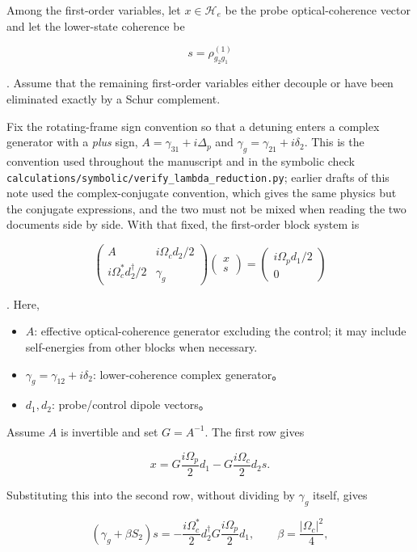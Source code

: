 \documentclass[
  10pt,
  a4paper,
]{article}
\providecommand{\tightlist}{%
  \setlength{\itemsep}{0pt}\setlength{\parskip}{0pt}}
\begin{document}
Among the first-order variables, let \(x\in\mathcal H_e\) be the probe
optical-coherence vector and let the lower-state coherence be

\[
s=\rho_{g_2g_1}^{(1)}
\]

. Assume that the remaining first-order variables either decouple or
have been eliminated exactly by a Schur complement.

Fix the rotating-frame sign convention so that a detuning enters a complex
generator with a \emph{plus} sign, $A=\gamma_{31}+i\Delta_p$ and
$\gamma_g=\gamma_{21}+i\delta_2$. This is the convention used throughout the
manuscript and in the symbolic check
\texttt{calculations/symbolic/verify\_lambda\_reduction.py}; earlier drafts of
this note used the complex-conjugate convention, which gives the same physics
but the conjugate expressions, and the two must not be mixed when reading the
two documents side by side. With that fixed, the first-order block system is

\[
\begin{pmatrix}
A & i\Omega_c d_2/2\\
i\Omega_c^*d_2^\dagger/2 & \gamma_g
\end{pmatrix}
\begin{pmatrix}x\\s\end{pmatrix}
=
\begin{pmatrix}i\Omega_p d_1/2\\0\end{pmatrix}
\]

. Here,

\begin{itemize}
\tightlist
\item
  \(A\): effective optical-coherence generator excluding the control; it
  may include self-energies from other blocks when necessary.
\item
  \(\gamma_g=\gamma_{12}+i\delta_2\): lower-coherence complex
  generator。
\item
  \(d_1,d_2\): probe/control dipole vectors。
\end{itemize}

Assume \(A\) is invertible and set \(G=A^{-1}\). The first row gives

\[
x
=G\frac{i\Omega_p}{2}d_1
-G\frac{i\Omega_c}{2}d_2s.
\]

Substituting this into the second row, without dividing by \(\gamma_g\)
itself, gives

\[
\left(\gamma_g+\beta S_2\right)s
=-\frac{i\Omega_c^*}{2}
 d_2^\dagger G\frac{i\Omega_p}{2}d_1,
\qquad
\beta=\frac{|\Omega_c|^2}{4},
\]
\end{document}

